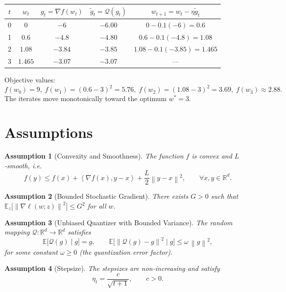 \documentclass{article}
\newtheorem{assumption}{Assumption}
\newcommand{\E}{\mathbb{E}}
\newcommand{\R}{\mathbb{R}}
\newcommand{\norm}[1]{\left\|#1\right\|}
\newcommand{\ip}[2]{\left\langle #1,#2\right\rangle}
\newcommand{\Q}{\mathcal{Q}}
\begin{document}
\begin{center}
\begin{tabular}{c|c|c|c|c}
$t$ & $w_{t}$ & $g_{t}= \nabla f(w_{t})$ & $\tilde g_{t}= \Q(g_{t})$ & $w_{t+1}=w_{t}-\eta\tilde g_{t}$\\\hline
0 & $0$ & $-6$ & $-6.00$ & $0-0.1(-6)=0.6$\\
1 & $0.6$ & $-4.8$ & $-4.80$ & $0.6-0.1(-4.8)=1.08$\\
2 & $1.08$ & $-3.84$ & $-3.85$ & $1.08-0.1(-3.85)=1.465$\\
3 & $1.465$ & $-3.07$ & $-3.07$ & — \\
\end{tabular}
\end{center}
Objective values:
\[
f(w_{0})=9,\;f(w_{1})=(0.6-3)^{2}=5.76,\;f(w_{2})=(1.08-3)^{2}=3.69,\;f(w_{3})\approx2.88.
\]
The iterates move monotonically toward the optimum $w^{*}=3$.

\newpage
\section*{Assumptions}
\begin{assumption}[Convexity and Smoothness]\label{ass:convex}
The function $f$ is convex and $L$‑smooth, i.e.
\[
f(y)\le f(x)+\ip{\nabla f(x)}{y-x}+\frac{L}{2}\norm{y-x}^{2},
\qquad\forall x,y\in\R^{d}.
\]
\end{assumption}
\begin{assumption}[Bounded Stochastic Gradient]\label{ass:gradbound}
There exists $G>0$ such that $\E_{z}\!\big[\norm{\nabla\ell(w;z)}^{2}\big]\le G^{2}$ for all $w$.
\end{assumption}
\begin{assumption}[Unbiased Quantizer with Bounded Variance]\label{ass:quantizer}
The random mapping $\Q:\R^{d}\rightarrow\R^{d}$ satisfies
\[
\E\!\big[\Q(g)\mid g\big]=g,\qquad 
\E\!\big[\norm{\Q(g)-g}^{2}\mid g\big]\le \omega\,\norm{g}^{2},
\]
for some constant $\omega\ge0$ (the \emph{quantization error factor}).
\end{assumption}
\begin{assumption}[Stepsize]\label{ass:stepsize}
The stepsizes are non‑increasing and satisfy
\[
\eta_{t}=\frac{c}{\sqrt{t+1}},\qquad c>0.
\]
\end{assumption}
\end{document}
